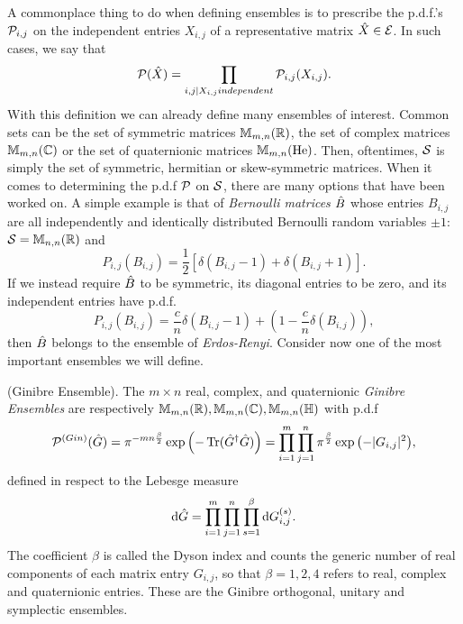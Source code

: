 A commonplace thing to do when defining ensembles is to prescribe the p.d.f.'s $\mathcal{P}_{i,j}$ on the independent entries $X_{i,j}$ of a representative matrix $\hat X \in \mathcal{E}$. In such cases, we say that
\begin{equation}
	\mathcal{P}(\hat X) = \prod_{i,j | X_{i,j} independent} \mathcal{P}_{i,j}(X_{i,j}).
\end{equation}
With this definition we can already define many ensembles of interest. Common sets can be the set of symmetric matrices $\mathbb{M}_{m,n}(\mathbb{R})$, the set of complex matrices $\mathbb{M}_{m,n}(\mathbb{C})$ or the set of quaternionic matrices $\mathbb{M}_{m,n}(\mathrm{He})$. Then, oftentimes, $\mathcal{S}$ is simply the set of symmetric, hermitian or skew-symmetric matrices. When it comes to determining the p.d.f $\mathcal{P}$ on $\mathcal{S}$, there are many options that have been worked on. A simple example is that of \textit{Bernoulli matrices} $\hat B$ whose entries $B_{i,j}$ are all independently and identically distributed Bernoulli random variables $\pm 1$: $\mathcal{S}=\mathbb{M}_{n,n}(\mathbb{R})$ and $$P_{i,j}(B_{i,j}) = \frac{1}{2} \left[ \delta(B_{i,j}-1) + \delta(B_{i,j}+1)\right].$$ If we instead require $\hat B$ to be symmetric, its diagonal entries to be zero, and its independent entries have p.d.f. $$P_{i,j}(B_{i,j}) = \frac{c}{n} \delta(B_{i,j}-1) + \left(1 - \frac{c}{n} \delta\left(B_{i,j}\right)\right),$$ then $\hat B$ belongs to the ensemble of \textit{Erdos-Renyi}. Consider now one of the most important ensembles we will define.

\begin{definition}
	(Ginibre Ensemble). The $m \times n$ real, complex, and quaternionic \textit{Ginibre Ensembles} are respectively $\mathbb{M}_{m,n}(\mathbb{R}), \mathbb{M}_{m,n}(\mathbb{C}), \mathbb{M}_{m,n}(\mathbb{H})$ with p.d.f
	\begin{equation}
		\mathcal{P}^{(Gin)}(\hat G) = \pi^{-mn\frac{\beta}{2}} \exp{\left( -\operatorname{Tr}(\hat G^{\dagger}\hat G)\right)} = \prod_{i=1}^{m} \prod_{j=1}^{n} \pi^{\frac{\beta}{2}} \exp{\left(-|G_{i,j}|^2 \right)},
	\end{equation}
	defined in respect to the Lebesge measure
	\begin{equation}
		\mathrm{d} \hat G = \prod_{i=1}^{m} \prod_{j=1}^{n} \prod_{s=1}^\beta \mathrm{d} G_{i,j}^{(s)}.
	\end{equation}
	The coefficient $\beta$ is called the Dyson index and counts the generic number of real components of each matrix entry $G_{i,j}$, so that $\beta=1,2,4$ refers to real, complex and quaternionic entries. These are the Ginibre orthogonal, unitary and symplectic ensembles.
	\label{Def: Ginibre}
\end{definition}

